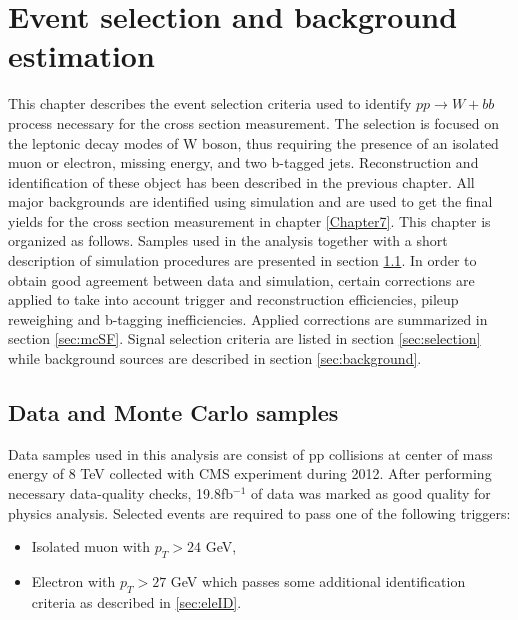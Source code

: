 
\chapter{Event selection and background estimation} %

\label{Chapter6} %


This chapter describes the event selection criteria used to identify $pp\rightarrow W+bb$ process necessary for the cross section measurement. The selection is focused on the leptonic decay modes of W boson, thus requiring the presence of an isolated muon or electron, missing energy, and two b-tagged jets. Reconstruction and identification of these object has been described in the previous chapter. All major backgrounds are identified using simulation and are used to get the final yields for the cross section measurement in chapter \ref{Chapter7}. 
This chapter is organized as follows. Samples used in the analysis together with a short description of simulation procedures are presented in section \ref{sec:samples}. In order to obtain good agreement between data and simulation, certain corrections are applied to take into account trigger and reconstruction efficiencies, pileup reweighing and b-tagging inefficiencies. Applied corrections are summarized in section \ref{sec:mcSF}. Signal selection criteria are listed in section \ref{sec:selection} while background sources are described in section \ref{sec:background}.     

\section{Data and Monte Carlo samples}
\label{sec:samples}
Data samples used in this analysis are consist of pp collisions at center of mass energy of 8 TeV collected with CMS experiment during 2012. After performing necessary data-quality checks, 19.8fb$^{-1}$ of data was marked as good quality for physics analysis. Selected events are required to pass one of the following triggers:
\begin{itemize}
\item Isolated muon with $p_T>24$ GeV,
\item Electron with $p_T>27$ GeV which passes some additional identification criteria as described in \ref{sec:eleID}.
\end{itemize}

